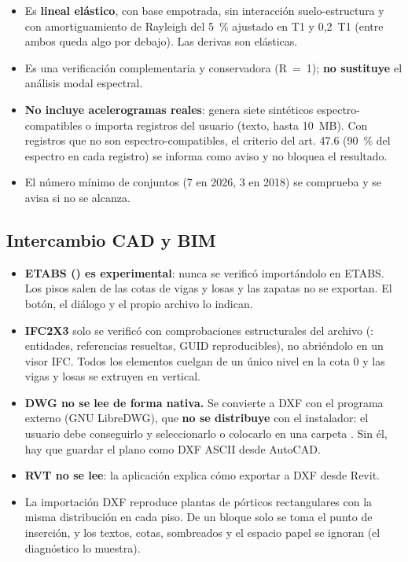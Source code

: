\begin{itemize}
	\item Es \textbf{lineal elástico}, con base empotrada, sin interacción suelo-estructura y con amortiguamiento de
	      Rayleigh del 5~\% ajustado en T1 y 0,2~T1 (entre ambos queda algo por debajo). Las derivas son elásticas.
	\item Es una verificación complementaria y conservadora (R~=~1); \textbf{no sustituye} el análisis modal espectral.
	\item \textbf{No incluye acelerogramas reales}: genera siete sintéticos espectro-compatibles o importa registros del
	      usuario (texto, hasta 10~MB). Con registros que no son espectro-compatibles, el criterio del art. 47.6 (90~\%
	      del espectro en cada registro) se informa como aviso y no bloquea el resultado.
	\item El número mínimo de conjuntos (7 en 2026, 3 en 2018) se comprueba y se avisa si no se alcanza.
\end{itemize}

\subsection{Intercambio CAD y BIM}

\begin{itemize}
	\item \textbf{ETABS () es experimental}: nunca se verificó importándolo en ETABS. Los pisos salen de las
	      cotas de vigas y losas y las zapatas no se exportan. El botón, el diálogo y el propio archivo lo indican.
	\item \textbf{IFC2X3} solo se verificó con comprobaciones estructurales del archivo (:
	      entidades, referencias resueltas, GUID reproducibles), no abriéndolo en un visor IFC. Todos los elementos
	      cuelgan de un único nivel en la cota 0 y las vigas y losas se extruyen en vertical.
	\item \textbf{DWG no se lee de forma nativa.} Se convierte a DXF con el programa externo  (GNU
	      LibreDWG), que \textbf{no se distribuye} con el instalador: el usuario debe conseguirlo y seleccionarlo o
	      colocarlo en una carpeta . Sin él, hay que guardar el plano como DXF ASCII desde AutoCAD.
	\item \textbf{RVT no se lee}: la aplicación explica cómo exportar a DXF desde Revit.
	\item La importación DXF reproduce plantas de pórticos rectangulares con la misma distribución en cada piso. De un
	      bloque solo se toma el punto de inserción, y los textos, cotas, sombreados y el espacio papel se ignoran (el
	      diagnóstico lo muestra).
\end{itemize}

